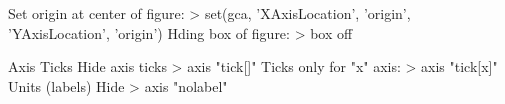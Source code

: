 Set origin at center of figure:
    > set(gca, 'XAxisLocation', 'origin', 'YAxisLocation', 'origin')
Hding box of figure:
    > box off

Axis
    Ticks
        Hide axis ticks
            > axis "tick[]"
        Ticks only for "x" axis:
            > axis "tick[x]"
    Units (labels)
        Hide
            > axis "nolabel"



